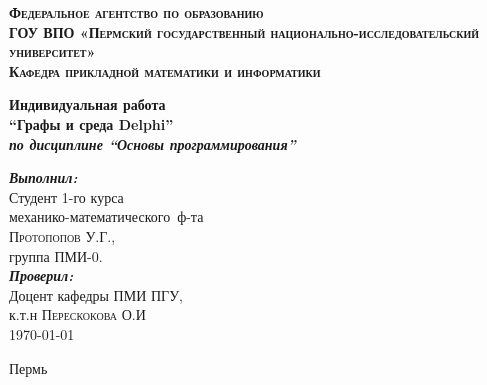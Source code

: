 \begin{titlepage}
\begin{center}


\textsc{\large \bf Федеральное агентство по образованию\\
ГОУ ВПО «Пермский государственный национально-исследовательский университет»\\
Кафедра прикладной математики и информатики}\\[1.5cm]

\vfill

{ \Large \bfseries Индивидуальная работа \\
``Графы и среда Delphi''\\
\em по дисциплине ``Основы программирования'' \\[0.4cm] }

\begin{flushright}
\begin{minipage}{0.5 \textwidth}
\begin{flushleft} \large
\emph{\bf Выполнил:} \\
Студент 1-го курса \\
механико-математического~ф-та \\
\textsc{Протопопов У.Г.},\\
группа ПМИ-0.\\
\emph{\bf Проверил:} \\
Доцент кафедры ПМИ ПГУ,\\
к.т.н {\underline{\hspace{50 pt}}} \textsc{Перескокова О.И}\\
\today
\end{flushleft}
\end{minipage}
\end{flushright}

\vfill

Пермь \the\year

\end{center}
\end{titlepage}

